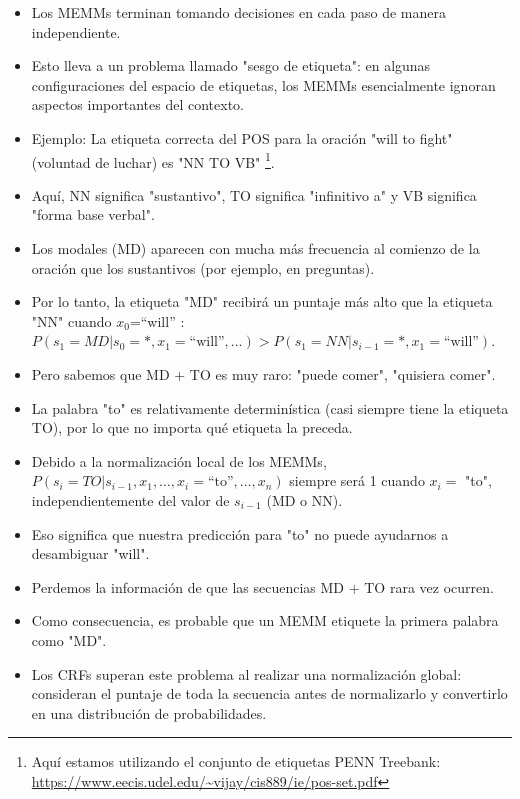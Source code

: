 \begin{itemize}

\item Los MEMMs terminan tomando decisiones en cada paso de manera independiente.

\item Esto lleva a un problema llamado "sesgo de etiqueta": en algunas configuraciones del espacio de etiquetas, los MEMMs esencialmente ignoran aspectos importantes del contexto.

\item Ejemplo: La etiqueta correcta del POS para la oración "will to fight" (voluntad de luchar) es "NN TO VB" \footnote{Aquí estamos utilizando el conjunto de etiquetas PENN Treebank: \url{https://www.eecis.udel.edu/~vijay/cis889/ie/pos-set.pdf}}.

\item Aquí, NN significa "sustantivo", TO significa "infinitivo a" y VB significa "forma base verbal".

\item Los modales (MD) aparecen con mucha más frecuencia al comienzo de la oración que los sustantivos (por ejemplo, en preguntas).

\item Por lo tanto, la etiqueta "MD" recibirá un puntaje más alto que la etiqueta "NN" cuando $x_0$=``will'' : $P(s_1 = MD|s_{0} = *,x_1 = \text{``will''},...) > P( s_1 = NN| s_{i-1} = *, x_1 = \text{``will''})$.

\item Pero sabemos que MD + TO es muy raro: "puede comer", "quisiera comer".

\item La palabra "to" es relativamente determinística (casi siempre tiene la etiqueta TO), por lo que no importa qué etiqueta la preceda.

\item Debido a la normalización local de los MEMMs,  $P(s_i = TO | s_{i-1}, x_1, \dots, x_i = \text{``to''}, \dots, x_n)$ siempre será 1 cuando $x_i=$ "to", independientemente del valor de $s_{i-1}$ (MD o NN).

\item Eso significa que nuestra predicción para "to" no puede ayudarnos a desambiguar "will".

\item Perdemos la información de que las secuencias MD + TO rara vez ocurren.

\item Como consecuencia, es probable que un MEMM etiquete la primera palabra como "MD".

\item Los CRFs superan este problema al realizar una normalización global: consideran el puntaje de toda la secuencia antes de normalizarlo y convertirlo en una distribución de probabilidades.

\end{itemize}


